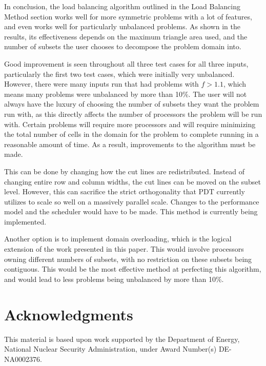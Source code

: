 \documentclass{anstrans}
\begin{document}
In conclusion, the load balancing algorithm outlined in the Load Balancing Method section works well for more symmetric problems with a lot of features, and even works well for particularly unbalanced problems. As shown in the results, its effectiveness depends on the maximum triangle area used, and the number of subsets the user chooses to decompose the problem domain into. 

Good improvement is seen throughout all three test cases for all three inputs, particularly the first two test cases, which were initially very unbalanced. However, there were many inputs run that had problems with $f > 1.1$, which means many problems were unbalanced by more than 10\%. The user will not always have the luxury of choosing the number of subsets they want the problem run with, as this directly affects the number of processors the problem will be run with. Certain problems will require more processors and will require minimizing the total number of cells in the domain for the problem to complete running in a reasonable amount of time. As a result, improvements to the algorithm must be made. 

This can be done by changing how the cut lines are redistributed. Instead of changing entire row and column widths, the cut lines can be moved on the subset level. However, this can sacrifice the strict orthogonality that PDT currently utilizes to scale so well on a massively parallel scale\cite{mpadams2015}. Changes to the performance model and the scheduler would have to be made. This method is currently being implemented.

Another option is to implement domain overloading\cite{mpadams2015}, which is the logical extension of the work presented in this paper. This would involve processors owning different numbers of subsets, with no restriction on these subsets being contiguous. This would be the most effective method at perfecting this algorithm, and would lead to less problems being unbalanced by more than 10\%.

%

\section{Acknowledgments}
This material is based upon work supported by the Department of Energy, National Nuclear Security Administration, under Award Number(s) DE-NA0002376.


\end{document}
